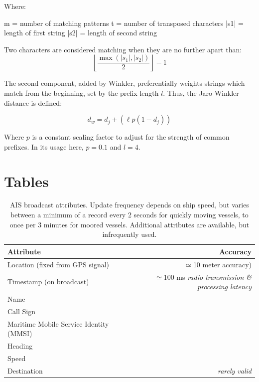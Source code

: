 Where:

m = number of matching patterns
t = number of transposed characters
|s1| = length of first string
|s2| = length of second string

Two characters are considered matching when they are no further apart than:
\begin{equation}
  \left\lfloor\frac{\max(|s_1|,|s_2|)}{2}\right\rfloor-1
\end{equation}

The second component, added by Winkler, preferentially weights strings which match from the beginning, set by the prefix length $ l $.  Thus, the Jaro-Winkler distance is defined:

\begin{equation}
  d_w = d_j + (\ell p (1 - d_j))
\end{equation}

Where $ p $ is a constant scaling factor to adjust for the strength of common prefixes. In its usage here, $ p = 0.1 $ and $ l = 4 $.



\chapter{Tables}

\begin{table}[htbp]
  \begin{tabular}{lr}
    Attribute & Accuracy \\
    \hline
    Location (fixed from GPS signal) & $\simeq$10 meter accuracy) \\
    Timestamp (on broadcast) & $\simeq$100 ms \textit{radio transmission \& processing latency}\\
    Name \\
    Call Sign \\
    Maritime Mobile Service Identity (MMSI) \\
    Heading \\
    Speed \\
    Destination & \textit{rarely valid}
  \end{tabular}
  \caption[AIS broadcast attributes]{AIS broadcast attributes. Update frequency depends on ship speed, but varies between a minimum of a record every 2 seconds for quickly moving vessels, to once per 3 minutes for moored vessels. Additional attributes are available, but infrequently used.}
  \label{table:ais-broadcast-attributes}
\end{table}

